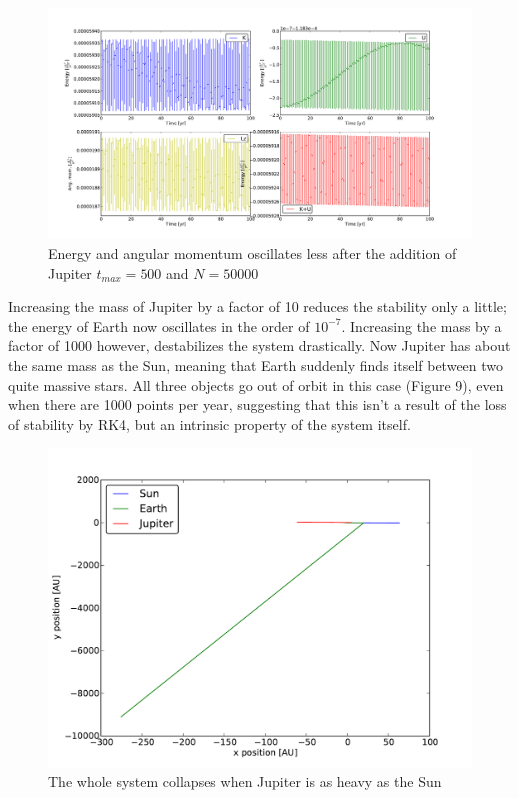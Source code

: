 \documentclass[a4paper,12pt, english]{article}
\begin{document}
\begin{figure}[!h]
\centering
\includegraphics[scale = 0.3]{Fig8.pdf}
\caption{Energy and angular momentum oscillates less after the addition of Jupiter $t_{max} = 500$ and $N = 50000$}
\end{figure} 

Increasing the mass of Jupiter by a factor of 10 reduces the stability only a little; the energy of Earth now oscillates in the order of $10^{-7}$. Increasing the mass by a factor of 1000 however, destabilizes the system drastically. Now Jupiter has about the same mass as the Sun, meaning that Earth suddenly finds itself between two quite massive stars. All three objects go out of orbit in this case (Figure 9), even when there are 1000 points per year, suggesting that this isn't a result of the loss of stability by RK4, but an intrinsic property of the system itself. 

\begin{figure}[!h]
\centering
\includegraphics[scale = 0.5]{Fig9.pdf}
\caption{The whole system collapses when Jupiter is as heavy as the Sun}
\end{figure} 
\end{document}
